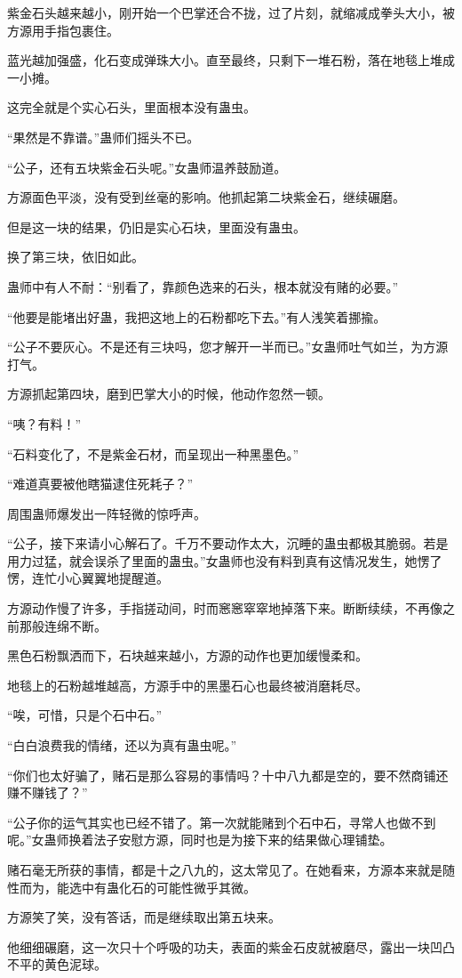 \begin{this_body}
紫金石头越来越小，刚开始一个巴掌还合不拢，过了片刻，就缩减成拳头大小，被方源用手指包裹住。

蓝光越加强盛，化石变成弹珠大小。直至最终，只剩下一堆石粉，落在地毯上堆成一小摊。

这完全就是个实心石头，里面根本没有蛊虫。

“果然是不靠谱。”蛊师们摇头不已。

“公子，还有五块紫金石头呢。”女蛊师温养鼓励道。

方源面色平淡，没有受到丝毫的影响。他抓起第二块紫金石，继续碾磨。

但是这一块的结果，仍旧是实心石块，里面没有蛊虫。

换了第三块，依旧如此。

蛊师中有人不耐：“别看了，靠颜色选来的石头，根本就没有赌的必要。”

“他要是能堵出好蛊，我把这地上的石粉都吃下去。”有人浅笑着挪揄。

“公子不要灰心。不是还有三块吗，您才解开一半而已。”女蛊师吐气如兰，为方源打气。

方源抓起第四块，磨到巴掌大小的时候，他动作忽然一顿。

“咦？有料！”

“石料变化了，不是紫金石材，而呈现出一种黑墨色。”

“难道真要被他瞎猫逮住死耗子？”

周围蛊师爆发出一阵轻微的惊呼声。

“公子，接下来请小心解石了。千万不要动作太大，沉睡的蛊虫都极其脆弱。若是用力过猛，就会误杀了里面的蛊虫。”女蛊师也没有料到真有这情况发生，她愣了愣，连忙小心翼翼地提醒道。

方源动作慢了许多，手指搓动间，时而窸窸窣窣地掉落下来。断断续续，不再像之前那般连绵不断。

黑色石粉飘洒而下，石块越来越小，方源的动作也更加缓慢柔和。

地毯上的石粉越堆越高，方源手中的黑墨石心也最终被消磨耗尽。

“唉，可惜，只是个石中石。”

“白白浪费我的情绪，还以为真有蛊虫呢。”

“你们也太好骗了，赌石是那么容易的事情吗？十中八九都是空的，要不然商铺还赚不赚钱了？”

“公子你的运气其实也已经不错了。第一次就能赌到个石中石，寻常人也做不到呢。”女蛊师换着法子安慰方源，同时也是为接下来的结果做心理铺垫。

赌石毫无所获的事情，都是十之八九的，这太常见了。在她看来，方源本来就是随性而为，能选中有蛊化石的可能性微乎其微。

方源笑了笑，没有答话，而是继续取出第五块来。

他细细碾磨，这一次只十个呼吸的功夫，表面的紫金石皮就被磨尽，露出一块凹凸不平的黄色泥球。

\end{this_body}

